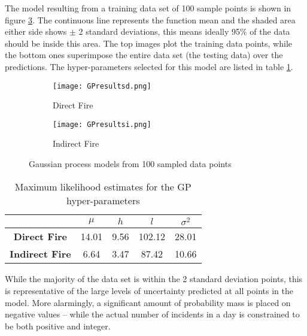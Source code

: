 \documentclass[a4paper,11pt]{report}
\begin{document}
The model resulting from a training data set of 100 sample points is shown in figure \ref{fig:GPresults}. The continuous line represents the function mean and the shaded area either side shows \(\pm\) 2 standard deviations, this means ideally 95\% of the data should be inside this area. The top images plot the training data points, while the bottom ones superimpose the entire data set (the testing data) over the predictions. The hyper-parameters selected for this model are listed in table \ref{GPhyperparameters}.

\begin{figure}
\centering
\begin{subfigure}{.5\textwidth}
	\centering
	\texttt{[image: GPresultsd.png]}
  	\caption{Direct Fire}
  	\label{fig:sub1}
\end{subfigure}%
\begin{subfigure}{.5\textwidth}
  	\centering
  	\texttt{[image: GPresultsi.png]}
  	\caption{Indirect Fire}
 	 \label{fig:sub2}
\end{subfigure}
\caption{Gaussian process models from 100 sampled data points}
\label{fig:GPresults}
\end{figure}

\singlespacing
\begin{table}[]
\centering
\caption{Maximum likelihood estimates for the GP hyper-parameters}
\label{GPhyperparameters}
\begin{tabular}{c|c|c|c|c|}
\cline{2-5}
\textbf{}                                    & \(\mu\) & \(h\) & \(l\) & \(\sigma^2\) \\ \hline
\multicolumn{1}{|c|}{\textbf{Direct Fire}}   & 14.01           & 9.56          & 102.12          & 28.01              \\ \hline
\multicolumn{1}{|c|}{\textbf{Indirect Fire}} & 6.64           & 3.47          & 87.42          & 10.66              \\ \hline
\end{tabular}
\end{table}
\doublespacing

While the majority of the data set is within the 2 standard deviation points, this is representative of the large levels of uncertainty predicted at all points in the model. More alarmingly, a significant amount of probability mass is placed on negative values -- while the actual number of incidents in a day is constrained to be both positive and integer. \par 
\end{document}
